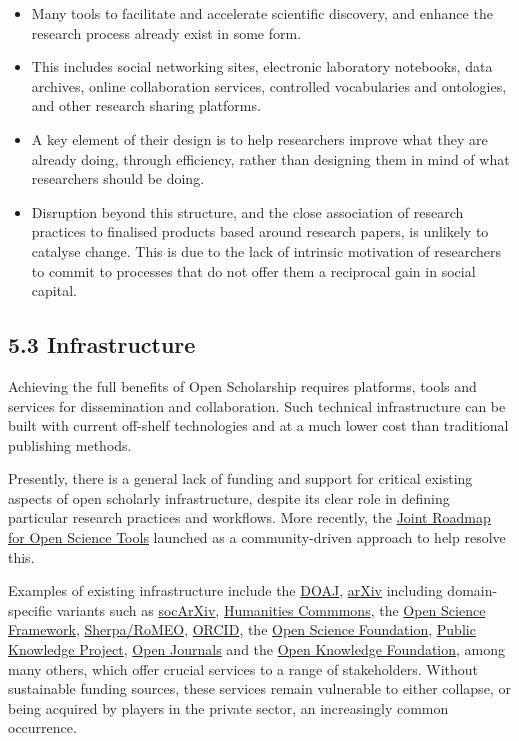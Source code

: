 \begin{itemize}
\item
  Many tools to facilitate and accelerate scientific discovery, and
  enhance the research process already exist in some form.
\item
  This includes social networking sites, electronic laboratory
  notebooks, data archives, online collaboration services, controlled
  vocabularies and ontologies, and other research sharing platforms.
\item
  A key element of their design is to help researchers improve what they
  are already doing, through efficiency, rather than designing them in
  mind of what researchers should be doing.
\item
  Disruption beyond this structure, and the close association of
  research practices to finalised products based around research papers,
  is unlikely to catalyse change. This is due to the lack of intrinsic
  motivation of researchers to commit to processes that do not offer
  them a reciprocal gain in social capital.
\end{itemize}

\subsection{5.3 Infrastructure }\label{infrastructure}

Achieving the full benefits of Open Scholarship requires platforms,
tools and services for dissemination and collaboration. Such technical
infrastructure can be built with current off-shelf technologies and at a
much lower cost than traditional publishing methods.

Presently, there is a general lack of funding and support for critical
existing aspects of open scholarly infrastructure, despite its clear
role in defining particular research practices and workflows. More
recently, the \href{https://jrost.org/}{Joint Roadmap for Open Science
Tools} launched as a community-driven approach to help resolve this.

Examples of existing infrastructure include the
\href{https://doaj.org/}{DOAJ}, \href{https://arxiv.org/}{arXiv}
including domain-specific variants such as
\href{http://socarxiv.org/}{socArXiv},
\href{https://hcommons.org/}{Humanities Commmons}, the
\href{https://osf.io/}{Open Science Framework},
\href{http://www.sherpa.ac.uk/romeo/index.php}{Sherpa/RoMEO},
\href{https://orcid.org/}{ORCID}, the
\href{http://opensciencefoundation.eu/}{Open Science Foundation},
\href{https://pkp.sfu.ca/}{Public Knowledge Project},
\href{https://www.theoj.org}{Open Journals} and the
\href{https://okfn.org/}{Open Knowledge Foundation}, among many others,
which offer crucial services to a range of stakeholders. Without
sustainable funding sources, these services remain vulnerable to either
collapse, or being acquired by players in the private sector, an
increasingly common occurrence.

